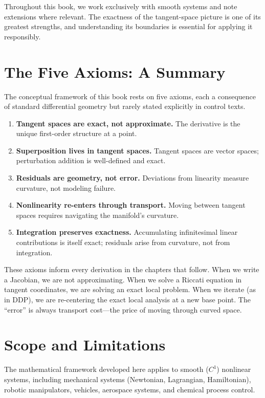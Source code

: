 Throughout this book, we work exclusively with smooth systems and note extensions where relevant.
The exactness of the tangent-space picture is one of its greatest strengths, and understanding
its boundaries is essential for applying it responsibly.


\section{The Five Axioms: A Summary}

The conceptual framework of this book rests on five axioms, each a consequence of
standard differential geometry but rarely stated explicitly in control texts.

\begin{enumerate}
\item \textbf{Tangent spaces are exact, not approximate.}
The derivative is the unique first-order structure at a point.

\item \textbf{Superposition lives in tangent spaces.}
Tangent spaces are vector spaces; perturbation addition is well-defined and exact.

\item \textbf{Residuals are geometry, not error.}
Deviations from linearity measure curvature, not modeling failure.

\item \textbf{Nonlinearity re-enters through transport.}
Moving between tangent spaces requires navigating the manifold's curvature.

\item \textbf{Integration preserves exactness.}
Accumulating infinitesimal linear contributions is itself exact; residuals
arise from curvature, not from integration.
\end{enumerate}

These axioms inform every derivation in the chapters that follow. When we write a
Jacobian, we are not approximating. When we solve a Riccati equation in tangent
coordinates, we are solving an exact local problem. When we iterate (as in DDP), we
are re-centering the exact local analysis at a new base point. The ``error'' is always
transport cost---the price of moving through curved space.


\section{Scope and Limitations}

The mathematical framework developed here applies to smooth ($C^1$) nonlinear systems,
including mechanical systems (Newtonian, Lagrangian, Hamiltonian), robotic manipulators,
vehicles, aerospace systems, and chemical process control.

